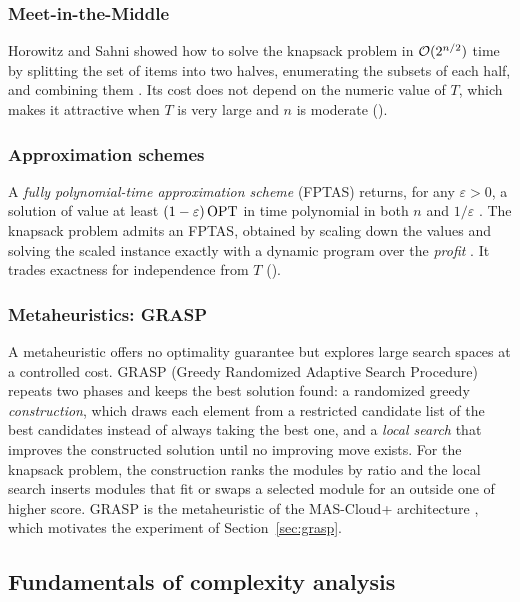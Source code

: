 \subsubsection{Meet-in-the-Middle}

Horowitz and Sahni showed how to solve the knapsack problem in $\mathcal{O}(2^{n/2})$ time by splitting the set of items into two halves, enumerating the subsets of each half, and combining them \cite{horowitz1974}. Its cost does not depend on the numeric value of $T$, which makes it attractive when $T$ is very large and $n$ is moderate ().

\subsubsection{Approximation schemes}

A \emph{fully polynomial-time approximation scheme} (FPTAS) returns, for any $\varepsilon>0$, a solution of value at least $(1-\varepsilon)\,\mathrm{OPT}$ in time polynomial in both $n$ and $1/\varepsilon$ \cite{vazirani2001,williamson2011}. The knapsack problem admits an FPTAS, obtained by scaling down the values and solving the scaled instance exactly with a dynamic program over the \emph{profit} \cite{ibarra1975,lawler1979}. It trades exactness for independence from $T$ ().

\subsubsection{Metaheuristics: GRASP}

A metaheuristic offers no optimality guarantee but explores large search spaces at a controlled cost. GRASP (Greedy Randomized Adaptive Search Procedure) \cite{feo1995grasp} repeats two phases and keeps the best solution found: a randomized greedy \emph{construction}, which draws each element from a restricted candidate list of the best candidates instead of always taking the best one, and a \emph{local search} that improves the constructed solution until no improving move exists. For the knapsack problem, the construction ranks the modules by ratio and the local search inserts modules that fit or swaps a selected module for an outside one of higher score. GRASP is the metaheuristic of the MAS-Cloud+ architecture \cite{mendes2024mascloud}, which motivates the experiment of Section~\ref{sec:grasp}.

\subsection{Fundamentals of complexity analysis}

